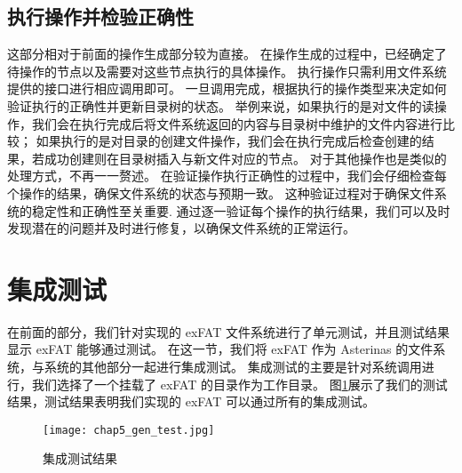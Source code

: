\subsection{执行操作并检验正确性}
这部分相对于前面的操作生成部分较为直接。
在操作生成的过程中，已经确定了待操作的节点以及需要对这些节点执行的具体操作。
执行操作只需利用文件系统提供的接口进行相应调用即可。
一旦调用完成，根据执行的操作类型来决定如何验证执行的正确性并更新目录树的状态。
举例来说，如果执行的是对文件的读操作，我们会在执行完成后将文件系统返回的内容与目录树中维护的文件内容进行比较；
如果执行的是对目录的创建文件操作，我们会在执行完成后检查创建的结果，若成功创建则在目录树插入与新文件对应的节点。
对于其他操作也是类似的处理方式，不再一一赘述。
在验证操作执行正确性的过程中，我们会仔细检查每个操作的结果，确保文件系统的状态与预期一致。
这种验证过程对于确保文件系统的稳定性和正确性至关重要.
通过逐一验证每个操作的执行结果，我们可以及时发现潜在的问题并及时进行修复，以确保文件系统的正常运行。

\section{集成测试}\label{sec:gen_test}
在前面的部分，我们针对实现的 exFAT 文件系统进行了单元测试，并且测试结果显示 exFAT 能够通过测试。
在这一节，我们将 exFAT 作为 Asterinas 的文件系统，与系统的其他部分一起进行集成测试。
集成测试的主要是针对系统调用进行，我们选择了一个挂载了 exFAT 的目录作为工作目录。
图\ref{fig:gen_test}展示了我们的测试结果，测试结果表明我们实现的 exFAT 可以通过所有的集成测试。

\begin{figure}[h]
    \centering
    \texttt{[image: chap5\_gen\_test.jpg]}
    \caption{集成测试结果}
    \label{fig:gen_test}
\end{figure}
